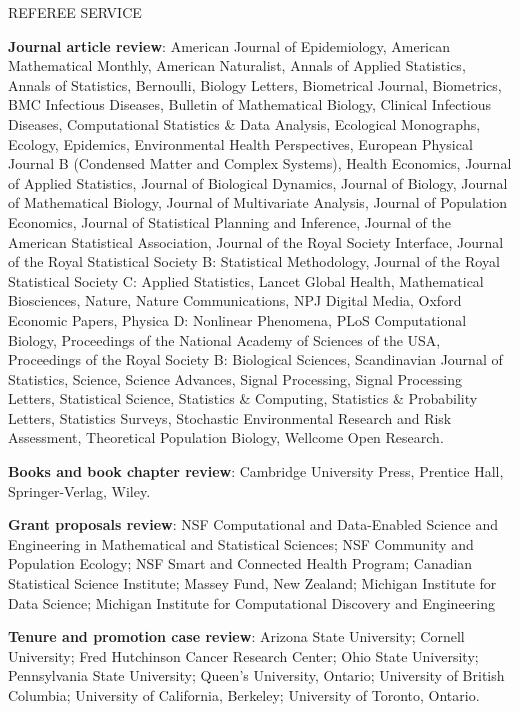 \begin{mylist}{REFEREE SERVICE} %
\item {\bf Journal article review}: 
American Journal of Epidemiology,
American Mathematical Monthly,
American Naturalist,
Annals of Applied Statistics,
Annals of Statistics,
Bernoulli,
Biology Letters,
Biometrical Journal,
Biometrics,
BMC Infectious Diseases,
Bulletin of Mathematical Biology,
Clinical Infectious Diseases,
Computational Statistics \& Data Analysis,
Ecological Monographs,
Ecology,
Epidemics,
Environmental Health Perspectives,
European Physical Journal B (Condensed Matter and Complex Systems),
Health Economics,
Journal of Applied Statistics,
Journal of Biological Dynamics,
Journal of Biology,
Journal of Mathematical Biology,
Journal of Multivariate Analysis,
Journal of Population Economics,
Journal of Statistical Planning and Inference,
Journal of the American Statistical Association, 
Journal of the Royal Society Interface,  
Journal of the Royal Statistical Society B: Statistical Methodology,
Journal of the Royal Statistical Society C: Applied Statistics,
Lancet Global Health,
Mathematical Biosciences,
Nature,
Nature Communications,
NPJ Digital Media,
Oxford Economic Papers,
Physica D: Nonlinear Phenomena,
PLoS Computational Biology,
Proceedings of the National Academy of Sciences of the USA,
Proceedings of the Royal Society B: Biological Sciences,
Scandinavian Journal of Statistics,
Science,
Science Advances,
Signal Processing,
Signal Processing Letters,
Statistical Science,
Statistics \& Computing,
Statistics \& Probability Letters,
Statistics Surveys,
Stochastic Environmental Research and Risk Assessment,
Theoretical Population Biology,
Wellcome Open Research.

\item {\bf Books and book chapter review}:
Cambridge University Press, 
Prentice Hall,
 Springer-Verlag,  
 Wiley.

\item {\bf Grant proposals review}: 
NSF Computational and Data-Enabled Science and Engineering in Mathematical and Statistical Sciences;
NSF Community and Population Ecology;
NSF Smart and Connected Health Program;
Canadian Statistical Science Institute;
Massey Fund, New Zealand;
Michigan Institute for Data Science;
Michigan Institute for Computational Discovery and Engineering

\item {\bf Tenure and promotion case review}:
Arizona State University;
Cornell University;
Fred Hutchinson Cancer Research Center;
Ohio State University;
Pennsylvania State University;
Queen's University, Ontario;
University of British Columbia;
University of California, Berkeley;
University of Toronto, Ontario.

\end{mylist}

